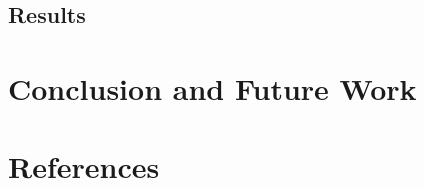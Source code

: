 \documentclass[12pt]{article}
\begin{document}
\subsection{Results}
\par %

\section{Conclusion and Future Work}
\par %





\newpage
\section{References}
\printbibliography
\end{document}
